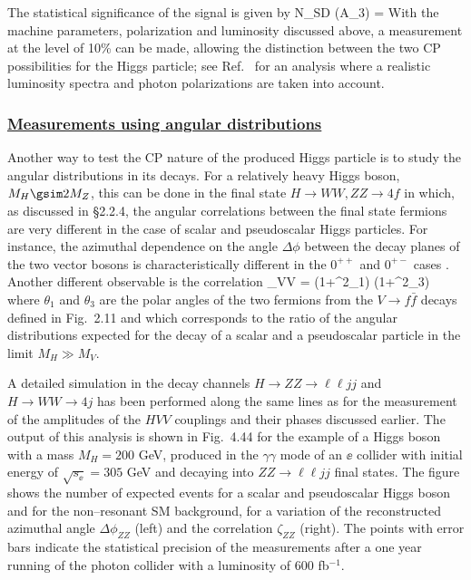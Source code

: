 The statistical significance of the signal is given by 
\beq
N_{\rm SD} ({\cal A}_3) =  { }
\times {}  
\eeq
With the machine parameters, polarization and luminosity discussed above, a
measurement at the level of 10\% can be made, allowing the
distinction between the two CP possibilities for the Higgs particle; see 
Ref.~\cite{gam-Gun} for an analysis where a realistic luminosity spectra and 
photon polarizations are taken into account. 

\subsubsection*{\underline{Measurements using angular distributions}} 

Another way to test the CP nature of the produced Higgs particle is to study 
the angular distributions in its decays. For a relatively heavy Higgs boson, 
$M_H \gsim 2M_Z$, this can be done in the final state $H \to WW,ZZ\to 4f$ in 
which, as discussed in \S2.2.4, the angular correlations between the final 
state fermions are very different in the case of scalar and pseudoscalar Higgs
particles. For instance, the azimuthal dependence on the angle $\Delta \phi$ 
between the decay planes of the two vector bosons is characteristically 
different in the $0^{++}$ and $0^{+-}$ cases \cite{Bargeretal,CPHVVchoi}. 
Another different observable is the correlation 
\beq
\zeta_{VV} =   {(1+\cos^2\theta_1) \;
(1+\cos^2\theta_3)} 
\eeq 
where $\theta_1$ and $\theta_3$ are the polar angles of the two fermions from
the $V \to f\bar f$ decays defined in Fig.~2.11 and which corresponds to
the ratio of the angular distributions expected for the decay of a scalar and a
pseudoscalar particle in the limit $M_H \gg M_V$. \s 

A detailed simulation in the decay channels $H \to ZZ \to \ell \ell jj$ and $H
\to WW \to 4j$ has been performed  \cite{gam-HVV-Warsaw} along the same lines 
as for
the measurement of the amplitudes of the $HVV$ couplings and their phases 
discussed earlier. The output of this analysis is shown in Fig.~4.44 for the 
example of a Higgs boson with a mass $M_H=200$ GeV, produced in the $\gamma 
\gamma$ mode of an $\ee$ collider with initial energy of $\sqrt{s_{\ee}}=
305$ GeV and decaying into $ZZ \to \ell \ell jj$ final states.  The figure 
shows the number of expected events for a scalar and pseudoscalar Higgs boson
and for the non--resonant SM background, for a variation of the reconstructed 
azimuthal angle $\Delta \phi_{ZZ}$ (left) and the correlation $\zeta_{ZZ}$ 
(right). The points with error bars indicate the statistical precision of the 
measurements after a one year running of the photon collider with a luminosity 
of 600 fb$^{-1}$. \s


